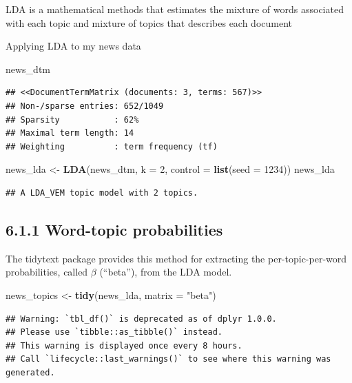\documentclass[]{article}
\newenvironment{Shaded}{\begin{snugshade}}{\end{snugshade}}
\newcommand{\DataTypeTok}[1]{\textcolor[rgb]{0.13,0.29,0.53}{#1}}
\newcommand{\DecValTok}[1]{\textcolor[rgb]{0.00,0.00,0.81}{#1}}
\newcommand{\KeywordTok}[1]{\textcolor[rgb]{0.13,0.29,0.53}{\textbf{#1}}}
\newcommand{\NormalTok}[1]{#1}
\newcommand{\StringTok}[1]{\textcolor[rgb]{0.31,0.60,0.02}{#1}}
\begin{document}
LDA is a mathematical methods that estimates the mixture of words
associated with each topic and mixture of topics that describes each
document

Applying LDA to my news data

\begin{Shaded}
\begin{Highlighting}[]
\NormalTok{news_dtm}
\end{Highlighting}
\end{Shaded}

\begin{verbatim}
## <<DocumentTermMatrix (documents: 3, terms: 567)>>
## Non-/sparse entries: 652/1049
## Sparsity           : 62%
## Maximal term length: 14
## Weighting          : term frequency (tf)
\end{verbatim}

\begin{Shaded}
\begin{Highlighting}[]
\NormalTok{news_lda <-}\StringTok{ }\KeywordTok{LDA}\NormalTok{(news_dtm, }\DataTypeTok{k =} \DecValTok{2}\NormalTok{, }\DataTypeTok{control =} \KeywordTok{list}\NormalTok{(}\DataTypeTok{seed =} \DecValTok{1234}\NormalTok{))}
\NormalTok{news_lda}
\end{Highlighting}
\end{Shaded}

\begin{verbatim}
## A LDA_VEM topic model with 2 topics.
\end{verbatim}

\hypertarget{word-topic-probabilities}{%
\subsection{6.1.1 Word-topic
probabilities}\label{word-topic-probabilities}}

The tidytext package provides this method for extracting the
per-topic-per-word probabilities, called \(β\) (``beta''), from the LDA
model.

\begin{Shaded}
\begin{Highlighting}[]
\NormalTok{news_topics <-}\StringTok{ }\KeywordTok{tidy}\NormalTok{(news_lda, }\DataTypeTok{matrix =} \StringTok{"beta"}\NormalTok{)}
\end{Highlighting}
\end{Shaded}

\begin{verbatim}
## Warning: `tbl_df()` is deprecated as of dplyr 1.0.0.
## Please use `tibble::as_tibble()` instead.
## This warning is displayed once every 8 hours.
## Call `lifecycle::last_warnings()` to see where this warning was generated.
\end{verbatim}
\end{document}
